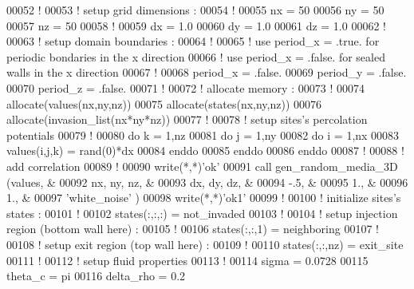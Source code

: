 \begin{DoxyCode}
00052 \textcolor{comment}{!}
00053 \textcolor{comment}{! setup grid dimensions :}
00054 \textcolor{comment}{!}
00055 nx = 50
00056 ny = 50
00057 nz = 50
00058 \textcolor{comment}{!}
00059 dx = 1.0
00060 dy = 1.0
00061 dz = 1.0
00062 \textcolor{comment}{!}
00063 \textcolor{comment}{! setup domain boundaries : }
00064 \textcolor{comment}{!}
00065 \textcolor{comment}{! use period\_x = .true. for periodic bondaries in the x direction}
00066 \textcolor{comment}{! use period\_x = .false. for sealed walls in the x direction}
00067 \textcolor{comment}{!}
00068 period\_x = .false.
00069 period\_y = .false.
00070 period\_z = .false.
00071 \textcolor{comment}{!}
00072 \textcolor{comment}{! allocate memory :}
00073 \textcolor{comment}{!}
00074 \textcolor{keyword}{allocate}(values(nx,ny,nz))
00075 \textcolor{keyword}{allocate}(states(nx,ny,nz))
00076 \textcolor{keyword}{allocate}(invasion\_list(nx*ny*nz))
00077 \textcolor{comment}{!}
00078 \textcolor{comment}{! setup sites's percolation potentials}
00079 \textcolor{comment}{!}
00080 \textcolor{keyword}{do} k = 1,nz
00081    \textcolor{keyword}{do} j = 1,ny
00082       \textcolor{keyword}{do} i = 1,nx
00083          values(i,j,k) = rand(0)*dx
00084       \textcolor{keyword}{enddo}
00085    \textcolor{keyword}{enddo}
00086 \textcolor{keyword}{enddo}
00087 \textcolor{comment}{!}
00088 \textcolor{comment}{! add correlation}
00089 \textcolor{comment}{!}
00090 \textcolor{keyword}{write}(*,*)\textcolor{stringliteral}{'ok'}
00091 call gen\_random\_media\_3D (values,             & 
00092                           nx, ny, nz,         &
00093                           dx, dy, dz,         &
00094                           -.5,                 &
00095                           1.,                 &
00096                           1.,                 &
00097                           \textcolor{stringliteral}{'white\_noise'}       )
00098 \textcolor{keyword}{write}(*,*)\textcolor{stringliteral}{'ok1'}
00099 \textcolor{comment}{!}
00100 \textcolor{comment}{! initialize sites's states :}
00101 \textcolor{comment}{!}
00102 states(:,:,:) = not\_invaded
00103 \textcolor{comment}{!}
00104 \textcolor{comment}{! setup injection region (bottom wall here) :}
00105 \textcolor{comment}{!}
00106 states(:,:,1) = neighboring
00107 \textcolor{comment}{!}
00108 \textcolor{comment}{! setup exit region (top wall here) :}
00109 \textcolor{comment}{!}
00110 states(:,:,nz) = exit\_site
00111 \textcolor{comment}{!}
00112 \textcolor{comment}{! setup fluid properties}
00113 \textcolor{comment}{!}
00114 sigma = 0.0728
00115 theta\_c = pi
00116 delta\_rho  = 0.2

\end{DoxyCode}
